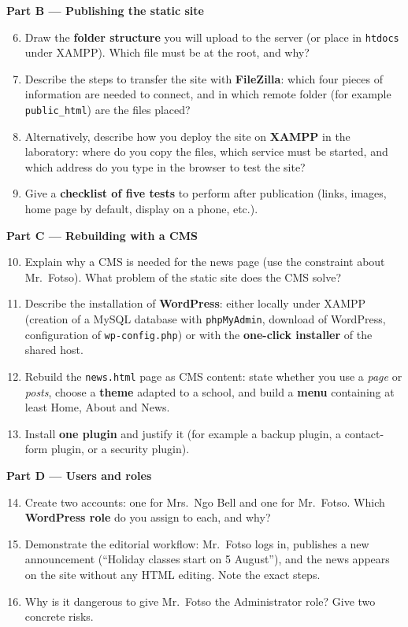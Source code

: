 \documentclass[11pt]{article}
\begin{document}
\textbf{Part B — Publishing the static site}

\begin{enumerate}
\setcounter{enumi}{5}
\item Draw the \textbf{folder structure} you will upload to the server (or place in \texttt{htdocs} under XAMPP). Which file must be at the root, and why?
\item Describe the steps to transfer the site with \textbf{FileZilla}: which four pieces of information are needed to connect, and in which remote folder (for example \texttt{public\_html}) are the files placed?
\item Alternatively, describe how you deploy the site on \textbf{XAMPP} in the laboratory: where do you copy the files, which service must be started, and which address do you type in the browser to test the site?
\item Give a \textbf{checklist of five tests} to perform after publication (links, images, home page by default, display on a phone, etc.).
\end{enumerate}

\textbf{Part C — Rebuilding with a CMS}

\begin{enumerate}
\setcounter{enumi}{9}
\item Explain why a CMS is needed for the news page (use the constraint about Mr.\ Fotso). What problem of the static site does the CMS solve?
\item Describe the installation of \textbf{WordPress}: either locally under XAMPP (creation of a MySQL database with \texttt{phpMyAdmin}, download of WordPress, configuration of \texttt{wp-config.php}) or with the \textbf{one-click installer} of the shared host.
\item Rebuild the \texttt{news.html} page as CMS content: state whether you use a \emph{page} or \emph{posts}, choose a \textbf{theme} adapted to a school, and build a \textbf{menu} containing at least Home, About and News.
\item Install \textbf{one plugin} and justify it (for example a backup plugin, a contact-form plugin, or a security plugin).
\end{enumerate}

\textbf{Part D — Users and roles}

\begin{enumerate}
\setcounter{enumi}{13}
\item Create two accounts: one for Mrs.\ Ngo Bell and one for Mr.\ Fotso. Which \textbf{WordPress role} do you assign to each, and why?
\item Demonstrate the editorial workflow: Mr.\ Fotso logs in, publishes a new announcement (``Holiday classes start on 5 August''), and the news appears on the site without any HTML editing. Note the exact steps.
\item Why is it dangerous to give Mr.\ Fotso the Administrator role? Give two concrete risks.
\end{enumerate}
\end{document}
